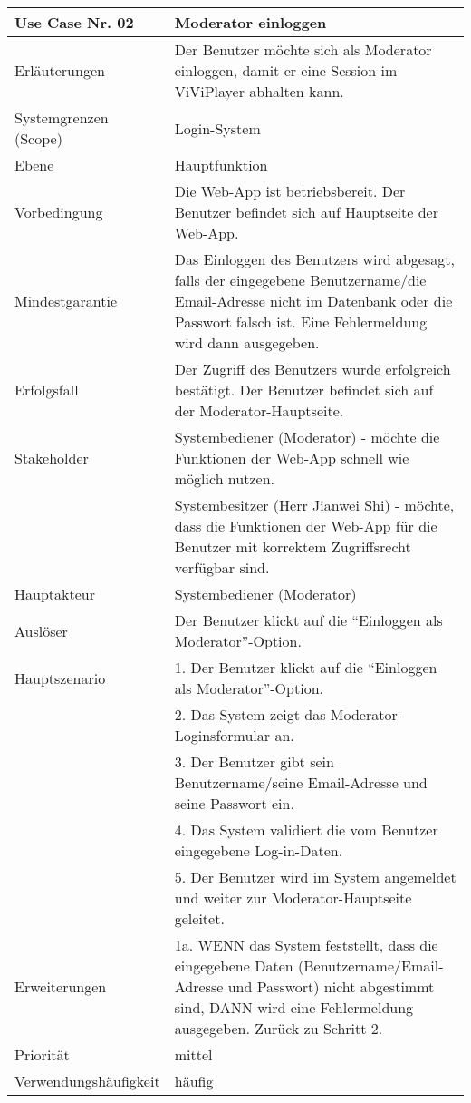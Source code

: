 \begin{tabularx}{\linewidth}{|l|X|}
	\hline
	Use Case Nr. 02			& \textbf{Moderator einloggen} \\ \hline
	Erläuterungen			& Der Benutzer möchte sich als Moderator einloggen, damit er eine 
							  Session im ViViPlayer abhalten kann. \\ \hline
	Systemgrenzen (Scope)	& Login-System \\ \hline
	Ebene					& Hauptfunktion \\ \hline
	Vorbedingung			& Die Web-App ist betriebsbereit. Der Benutzer befindet sich auf
							  Hauptseite der Web-App. \\ \hline
	Mindestgarantie			& Das Einloggen des Benutzers wird abgesagt, falls der eingegebene
							  Benutzername/die Email-Adresse nicht im Datenbank oder die Passwort falsch ist. Eine Fehlermeldung wird dann ausgegeben.
							  \\ \hline
	Erfolgsfall 			& Der Zugriff des Benutzers wurde erfolgreich bestätigt. Der
							  Benutzer befindet sich auf der Moderator-Hauptseite. 
							  \\ \hline
	Stakeholder				& Systembediener (Moderator) - möchte die Funktionen der Web-App 
							  schnell wie möglich nutzen. \\
							& Systembesitzer (Herr Jianwei Shi) - möchte, dass die Funktionen 
							  der Web-App für die Benutzer mit korrektem Zugriffsrecht verfügbar sind.\\ \hline
	Hauptakteur				& Systembediener (Moderator) \\ \hline
	Auslöser				& Der Benutzer klickt auf die ``Einloggen als Moderator''-Option.\\ 
							  \hline	
	Hauptszenario			& 1. Der Benutzer klickt auf die ``Einloggen als 
							  Moderator''-Option.\\
							& 2. Das System zeigt das Moderator-Loginsformular an. \\
							& 3. Der Benutzer gibt sein Benutzername/seine Email-Adresse und 
							  seine Passwort ein. \\
							& 4. Das System validiert die vom Benutzer eingegebene
							  Log-in-Daten. \\
							& 5. Der Benutzer wird im System angemeldet und weiter zur
							  Moderator-Hauptseite geleitet. \\ \hline
	Erweiterungen			& 1a. WENN das System feststellt, dass die eingegebene Daten 
							  (Benutzername/Email-Adresse und Passwort) nicht abgestimmt sind, DANN wird eine Fehlermeldung ausgegeben. Zurück zu Schritt 2. \\ \hline
	Priorität				& mittel \\ \hline
	Verwendungshäufigkeit	& häufig \\ \hline
\end{tabularx}

